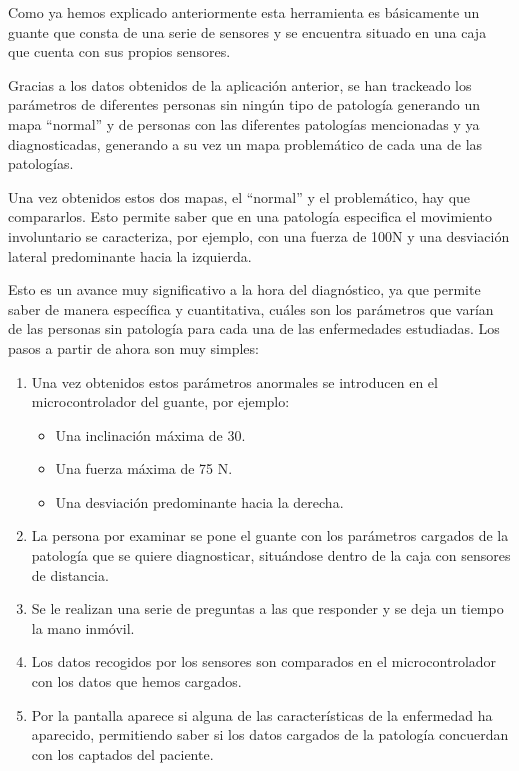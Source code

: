 Como ya hemos explicado anteriormente esta herramienta es básicamente un guante que consta de una serie de sensores y se encuentra situado en una caja que cuenta con sus propios sensores. 

Gracias a los datos obtenidos de la aplicación anterior, se han trackeado los parámetros de diferentes personas sin ningún tipo de patología generando un mapa “normal” y de personas con las diferentes patologías mencionadas y ya diagnosticadas, generando a su vez un mapa problemático de cada una de las patologías.

Una vez obtenidos estos dos mapas, el “normal” y el problemático, hay que compararlos. Esto permite saber que en una patología especifica el movimiento involuntario se caracteriza, por ejemplo, con una fuerza de 100N y una desviación lateral predominante hacia la izquierda.

Esto es un avance muy significativo a la hora del diagnóstico, ya que permite saber de manera específica y cuantitativa, cuáles son los parámetros que varían de las personas sin patología para cada una de las enfermedades estudiadas. Los pasos a partir de ahora son muy simples:

\begin{enumerate}
    \item Una vez obtenidos estos parámetros anormales se introducen en el microcontrolador del guante, por ejemplo:
	\begin{itemize}
		\item Una inclinación máxima de 30\textdegree.
		\item Una fuerza máxima de 75 N.
		\item Una desviación predominante hacia la derecha.
	\end{itemize}
    \item La persona por examinar se pone el guante con los parámetros cargados de la patología que se quiere diagnosticar, situándose dentro de la caja con sensores de distancia.
    \item Se le realizan una serie de preguntas a las que responder y se deja un tiempo la mano inmóvil.
    \item Los datos recogidos por los sensores son comparados en el microcontrolador con los datos que hemos cargados.
    \item Por la pantalla aparece si alguna de las características de la enfermedad ha aparecido, permitiendo saber si los datos cargados de la patología concuerdan con los captados del paciente.
\end{enumerate}

